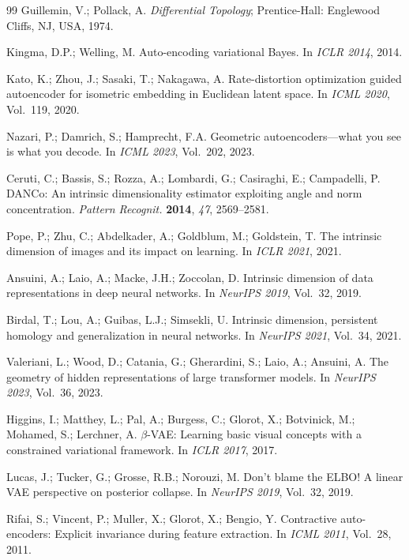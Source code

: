 \documentclass[11pt,a4paper]{article}
\begin{document}
\begin{thebibliography}{99}
Guillemin, V.; Pollack, A. \textit{Differential Topology};
Prentice-Hall: Englewood Cliffs, NJ, USA, 1974.

Kingma, D.P.; Welling, M.
Auto-encoding variational Bayes.
In \textit{ICLR 2014}, 2014.

Kato, K.; Zhou, J.; Sasaki, T.; Nakagawa, A.
Rate-distortion optimization guided autoencoder for isometric embedding in Euclidean latent space.
In \textit{ICML 2020}, Vol.~119, 2020.

Nazari, P.; Damrich, S.; Hamprecht, F.A.
Geometric autoencoders---what you see is what you decode.
In \textit{ICML 2023}, Vol.~202, 2023.

Ceruti, C.; Bassis, S.; Rozza, A.; Lombardi, G.; Casiraghi, E.; Campadelli, P.
DANCo: An intrinsic dimensionality estimator exploiting angle and norm concentration.
\textit{Pattern Recognit.} \textbf{2014}, \textit{47}, 2569--2581.

Pope, P.; Zhu, C.; Abdelkader, A.; Goldblum, M.; Goldstein, T.
The intrinsic dimension of images and its impact on learning.
In \textit{ICLR 2021}, 2021.

Ansuini, A.; Laio, A.; Macke, J.H.; Zoccolan, D.
Intrinsic dimension of data representations in deep neural networks.
In \textit{NeurIPS 2019}, Vol.~32, 2019.

Birdal, T.; Lou, A.; Guibas, L.J.; Simsekli, U.
Intrinsic dimension, persistent homology and generalization in neural networks.
In \textit{NeurIPS 2021}, Vol.~34, 2021.

Valeriani, L.; Wood, D.; Catania, G.; Gherardini, S.; Laio, A.; Ansuini, A.
The geometry of hidden representations of large transformer models.
In \textit{NeurIPS 2023}, Vol.~36, 2023.

Higgins, I.; Matthey, L.; Pal, A.; Burgess, C.; Glorot, X.; Botvinick, M.;
Mohamed, S.; Lerchner, A.
$\beta$-VAE: Learning basic visual concepts with a constrained variational framework.
In \textit{ICLR 2017}, 2017.

Lucas, J.; Tucker, G.; Grosse, R.B.; Norouzi, M.
Don't blame the ELBO! A linear VAE perspective on posterior collapse.
In \textit{NeurIPS 2019}, Vol.~32, 2019.

Rifai, S.; Vincent, P.; Muller, X.; Glorot, X.; Bengio, Y.
Contractive auto-encoders: Explicit invariance during feature extraction.
In \textit{ICML 2011}, Vol.~28, 2011.


\end{thebibliography}
\end{document}

